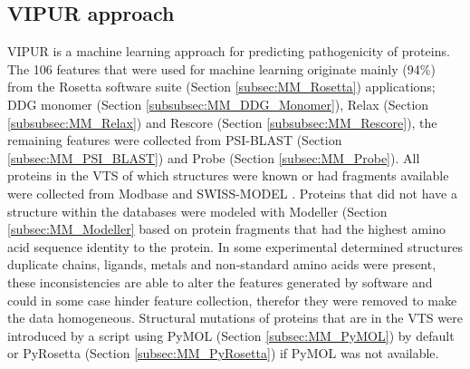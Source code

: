 \subsection{VIPUR approach}
VIPUR is a machine learning approach for predicting pathogenicity of proteins. The 106 features that were used for machine learning originate mainly (94\%) from the Rosetta software suite (Section \ref{subsec:MM_Rosetta}) applications; DDG monomer (Section \ref{subsubsec:MM_DDG_Monomer}), Relax (Section \ref{subsubsec:MM_Relax}) and Rescore (Section \ref{subsubsec:MM_Rescore}), the remaining features were collected from PSI-BLAST (Section \ref{subsec:MM_PSI_BLAST}) and Probe (Section \ref{subsec:MM_Probe}). 
All proteins in the VTS of which structures were known or had fragments available were collected from Modbase \cite{} and
SWISS-MODEL \cite{}.
Proteins that did not have a structure within the databases were modeled with Modeller (Section \ref{subsec:MM_Modeller} based on protein fragments that had the highest amino acid sequence identity to the protein.
In some experimental determined structures duplicate chains, ligands, metals and non-standard amino acids were present, these inconsistencies are able to alter the features generated by software and could in some case hinder feature collection, therefor they were removed to make the data homogeneous. Structural mutations of proteins that are in the VTS were introduced by a script using PyMOL (Section \ref{subsec:MM_PyMOL}) by default or PyRosetta (Section \ref{subsec:MM_PyRosetta}) if PyMOL was not available.



\label{subsec:MM_VIPUR}

